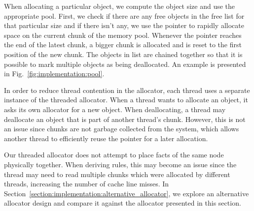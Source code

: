 When allocating a particular object, we compute the object size and use the
appropriate pool. First, we check if there are any free objects in the free list
for that particular size and if there isn't any, we use the  pointer
to rapidly allocate space on the current chunk of the memory pool.  Whenever the
 pointer reaches the end of the latest chunk, a bigger chunk is
allocated and  is reset to the first position of the new chunk. The
objects in  list are chained together so that it is possible to mark
multiple objects as being deallocated.  An example is presented in
Fig.~\ref{fig:implementation:pool}.


In order to reduce thread contention in the allocator, each thread uses a
separate instance of the threaded allocator. When a thread wants to allocate an
object, it asks its own allocator for a new object. When deallocating, a thread
may deallocate an object that is part of another thread's chunk. However, this is
not an issue since chunks are not garbage collected from the system, which
allows another thread to efficiently reuse the pointer for a later allocation.

Our threaded allocator does not attempt to place facts of the same node physically
together. When deriving rules, this may become an issue since the thread may
need to read multiple chunks which were allocated by different threads,
increasing the number of cache line misses. In
Section~\ref{section:implementation:alternative_allocator}, we explore an
alternative allocator design and compare it against the allocator presented in
this section.
